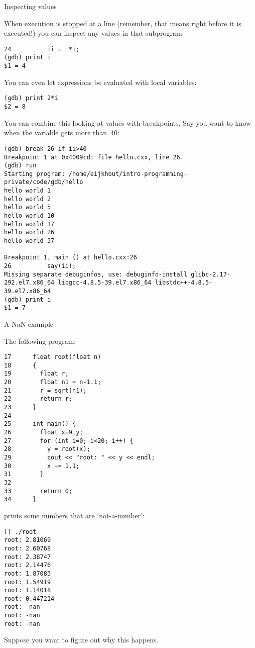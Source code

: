  {Inspecting values}

When execution is stopped at a line
(remember, that means right before it is executed!)
you can inspect any values in that subprogram:
\begin{verbatim}
24          ii = i*i;
(gdb) print i
$1 = 4
\end{verbatim}
You can even let expressions be evaluated with local variables:
\begin{verbatim}
(gdb) print 2*i
$2 = 8
\end{verbatim}

You can combine this looking at values with breakpoints.
Say you want to know when the variable  gets more than~40:
\begin{verbatim}
(gdb) break 26 if ii>40
Breakpoint 1 at 0x4009cd: file hello.cxx, line 26.
(gdb) run
Starting program: /home/eijkhout/intro-programming-private/code/gdb/hello
hello world 1
hello world 2
hello world 5
hello world 10
hello world 17
hello world 26
hello world 37

Breakpoint 1, main () at hello.cxx:26
26          say(ii);
Missing separate debuginfos, use: debuginfo-install glibc-2.17-292.el7.x86_64 libgcc-4.8.5-39.el7.x86_64 libstdc++-4.8.5-39.el7.x86_64
(gdb) print i
$1 = 7
\end{verbatim}

 {A NaN example}

The following program:
\begin{lstlisting}
17      float root(float n)
18      {
19        float r;
20        float n1 = n-1.1;
21        r = sqrt(n1);
22        return r;
23      }
24
25      int main() {
26        float x=9,y;
27        for (int i=0; i<20; i++) {
28          y = root(x);
29          cout << "root: " << y << endl;
30          x -= 1.1;
31        }
32
33        return 0;
34      }
\end{lstlisting}
prints some numbers that are `not-a-number':
\begin{verbatim}
[] ./root
root: 2.81069
root: 2.60768
root: 2.38747
root: 2.14476
root: 1.87083
root: 1.54919
root: 1.14018
root: 0.447214
root: -nan
root: -nan
root: -nan
\end{verbatim}
Suppose you want to figure out why this happens.

